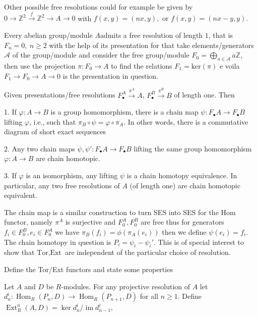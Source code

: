 Other possible free resolutions could for example be given by 
\(0 \longrightarrow \mathbb{Z}^2 \xrightarrow{f} \mathbb{Z}^2 \longrightarrow A \longrightarrow 0\) with
\(f(x,y) = (nx, y), \text{ or } f(x, y) = (nx-y, y).\)

Every abelian group/module \( A  \)admits a free resolution of length \( 1 \), that is \( F_n = 0,\ n \geq 2 \) with the help of
its presentation for that take elements/generators \( \mathcal{A} \) of the group/module and consider the free group/module 
\( F_0 = \bigoplus_{a \in \mathcal{A}} a\mathbb{Z} \), then use the projection \( \pi : F_0 \to A \) to find the relations \( F_1 = \text{ker}(\pi) \)
e voila \( F_1 \to F_0 \to A \to 0 \) is the presentation in question.

Given presentations/free resolutions \( F^A_{\bullet} \xrightarrow{\pi^A} A \), \( F^B_{\bullet} \xrightarrow{\pi^B} B \) of length one. Then


1. If \(\varphi : A \to B\) is a group homomorphism, there is a chain map \(\psi : F_\bullet A \to F_\bullet B\) lifting \(\varphi\), 
i.e., such that \(\pi_B \circ \psi = \varphi \circ \pi_A\). In other words, there is a commutative diagram of short exact sequences

2. Any two chain maps \(\psi, \psi' : F_\bullet A \to F_\bullet B\) lifting the same group homomorphism \(\varphi : A \to B\) are chain homotopic. 

3. If \(\varphi\) is an isomorphism, any lifting \(\psi\) is a chain homotopy equivalence. In particular, any two free resolutions of \(A\) (of length one) are chain homotopic equivalent.

The chain map is a similar construction to turn SES into SES for the \( \text{Hom} \) functor, namely  \( \pi^A \) is surjective and 
\( F^A_0, F^B_0 \) are free thus for generators \(f_i \in F^B_0, e_i \in F^A_0 \) we have \( \pi_B(f_i) = \phi(\pi_A(e_i)) \) then we define 
\( \psi(e_i) = f_i \). The chain homotopy in question is \( P_i = \psi_i - \psi_i' \).
This is of special interest to show that \( \text{Tor}, \text{Ext} \) are independent of the particular choice of resolution.

Define the Tor/Ext functors and state some properties

Let \(A\) and \(D\) be \(R\)-modules. For any projective resolution of \(A\)
let 
\(
d_n^i : \operatorname{Hom}_R(P_{n}, D) \to \operatorname{Hom}_R(P_{n+1}, D)
\)
for all \(n \geq 1\). Define
\(
\operatorname{Ext}_R^n(A, D) = \ker d_{n}^i / \operatorname{im} d_{n-1}^i,
\)

